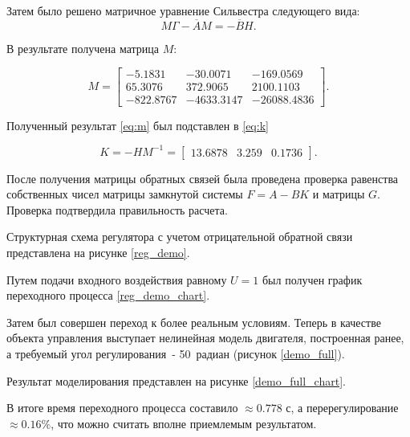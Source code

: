Затем было решено матричное уравнение Сильвестра следующего вида:
$$
  M\Gamma-\overline{A}M=-\overline{B}H.
$$

В результате получена матрица $M$:

\begin{equation}
  M=\begin{bmatrix}-5.1831&-30.0071&-169.0569\\65.3076&372.9065&2100.1103\\-822.8767&-4633.3147&-26088.4836\end{bmatrix}.
  \label{eq:m}
\end{equation}

Полученный результат \ref{eq:m} был подставлен в \ref{eq:k}

\begin{equation}
  K=-HM^{-1}=\begin{bmatrix}13.6878&3.259&0.1736\end{bmatrix}.
  \label{eq:k}
\end{equation}

После получения матрицы обратных связей была проведена проверка равенства
собственных чисел матрицы замкнутой системы $F = A - BK$ и матрицы $G$.
Проверка подтвердила правильность расчета.

Структурная схема регулятора с учетом отрицательной обратной связи представлена на рисунке \ref{reg_demo}.


Путем подачи входного воздействия равному $U=1$ был получен график переходного процесса \ref{reg_demo_chart}.


Затем был совершен переход к более реальным условиям. Теперь в качестве объекта управления
выступает нелинейная модель двигателя, построенная ранее, а требуемый угол 
регулирования~- 50~радиан (рисунок \ref{demo_full}).


Результат моделирования представлен на рисунке \ref{demo_full_chart}.

\clearpage


В итоге время переходного процесса составило $\approx0.778$ с, а перерегулирование $\approx0.16\%$,
что можно считать вполне приемлемым результатом.